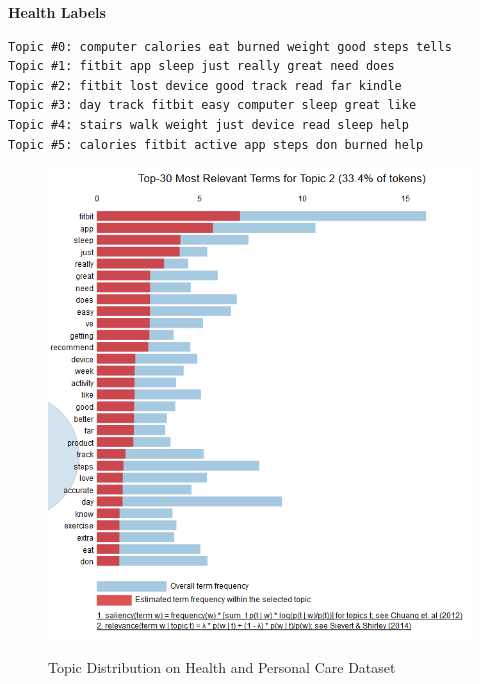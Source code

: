 \textbf{Health Labels}
\begin{verbatim}
Topic #0: computer calories eat burned weight good steps tells
Topic #1: fitbit app sleep just really great need does
Topic #2: fitbit lost device good track read far kindle
Topic #3: day track fitbit easy computer sleep great like
Topic #4: stairs walk weight just device read sleep help
Topic #5: calories fitbit active app steps don burned help
\end{verbatim}


\begin{figure}[H]
  {\includegraphics[width = 0.85 \textwidth]{img/lda/2a.PNG}}
  \caption{Topic Distribution on Health and Personal Care Dataset}
\end{figure}




